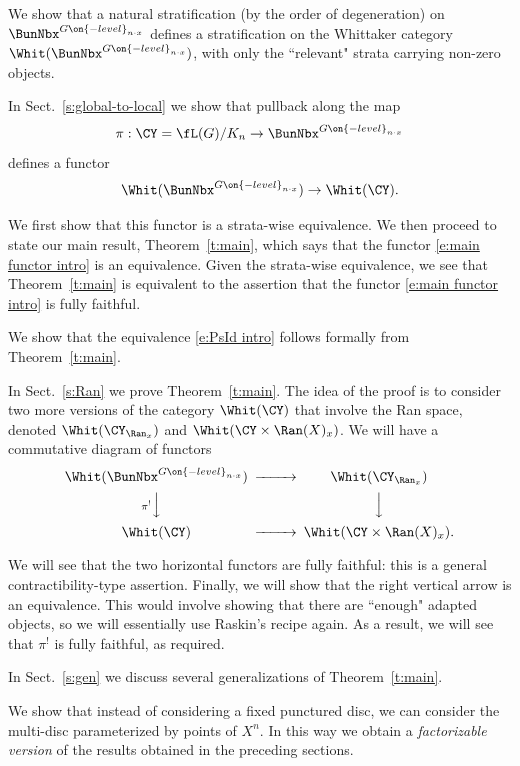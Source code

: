 \documentclass[9pt]{amsart}
\theoremstyle{definition}
\theoremstyle{remark}
\newcommand{\thmref}[1]{Theorem~\ref{#1}}
\newcommand{\secref}[1]{Sect.~\ref{#1}}
\numberwithin{equation}{section}
\begin{document}
\medskip

We show that a natural stratification (by the order of degeneration) on $\BunNbx^{G\on{-level}_{n\cdot x}}$ defines a 
stratification on the Whittaker category $\Whit(\BunNbx^{G\on{-level}_{n\cdot x}})$, with only the ``relevant" strata
carrying non-zero objects. 

\sssec{}

In \secref{s:global-to-local} we show that pullback along the map
$$\pi:\CY=\fL(G)/K_n\to \BunNbx^{G\on{-level}_{n\cdot x}}$$
defines a functor
\begin{equation} \label{e:main functor intro}
\Whit(\BunNbx^{G\on{-level}_{n\cdot x}})\to \Whit(\CY).
\end{equation}

We first show that this functor is a strata-wise equivalence. We then proceed to state our main result,
\thmref{t:main}, which says that the functor \eqref{e:main functor intro} is an equivalence. Given the strata-wise
equivalence, we see that \thmref{t:main} is equivalent to the assertion that the functor \eqref{e:main functor intro} 
is fully faithful.

\medskip

We show that
the equivalence \eqref{e:PsId intro} follows formally from \thmref{t:main}.

\sssec{}

In \secref{s:Ran} we prove \thmref{t:main}. The idea of the proof is to consider two more versions 
of the category $\Whit(\CY)$ that involve the Ran space, denoted $\Whit(\CY_{\Ran_x} )$ and $\Whit(\CY\times \Ran(X)_x)$. 
We will have a commutative diagram of functors
$$
\CD
\Whit(\BunNbx^{G\on{-level}_{n\cdot x}})   @>>> \Whit(\CY_{\Ran_x} ) \\
@V{\pi^!}VV   @VVV \\
\Whit(\CY)  @>>> \Whit(\CY\times \Ran(X)_x).
\endCD
$$

We will see that the two horizontal functors are fully faithful: this is a general contractibility-type
assertion. Finally, we will show that the right vertical arrow is an equivalence. This would involve
showing that there are ``enough" adapted objects, so we will essentially use Raskin's recipe again. 
As a result, we will see that $\pi^!$ is fully faithful, as required.

\sssec{}

In \secref{s:gen} we discuss several generalizations of \thmref{t:main}. 

\medskip

We show that instead of considering a fixed punctured disc, we can consider the multi-disc parameterized by points of $X^n$.
In this way we obtain a \emph{factorizable version} of the results obtained in the preceding sections. 
\end{document}
